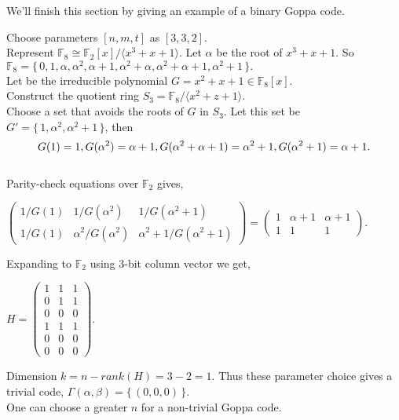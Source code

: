 We'll finish this section by giving an example of a binary Goppa code.
\begin{exmp}
    Choose parameters $[n, m, t]$ as $[3, 3, 2]$.\\
    Represent $\mathbb{F}_8 \cong \mathbb{F}_2[x]/ \langle x^3+x+1 \rangle$. Let $\alpha$ be the root of $x^3+x+1$. So $\mathbb{F}_8 = \{\,0,1,\alpha,\alpha^2,\alpha+1,\alpha^2+\alpha, \alpha^2+\alpha+1,\alpha^2+1\,\}.$\\ 
    Let be the irreducible polynomial $G = x^2+x+1 \in \mathbb{F}_8[x]$.\\
    Construct the quotient ring $S_3 = \mathbb{F}_8/\langle x^2+z+1\rangle.$\\
    Choose a set that avoids the roots of $G$ in $S_3$. Let this set be 
    $G'=\{\,1, \alpha^2,\alpha^2+1\,\}$, then
    \[        
    \noindent G(1)=1\\,G(\alpha^2)=\alpha+1\\,
    G(\alpha^2+\alpha+1)=\alpha^2+1\\,G(\alpha^2+1)=\alpha+1.
    \]\\
    Parity-check equations over $\mathbb{F}_2$ gives,
\begin{center}
    $\begin{pmatrix}
    1/G(1) &1/G(\alpha^2)& 1/G(\alpha^2+1)\\
    1/G(1) &\alpha^2/G(\alpha^2)& \alpha^2+1/G(\alpha^2+1)
    \end{pmatrix} = \begin{pmatrix}
    1 & \alpha+1 & \alpha+1\\
    1 & 1 & 1
    \end{pmatrix}.$\\[0.4cm]
\end{center}
    Expanding to $\mathbb{F}_2$ using 3-bit column vector we get,
\begin{center}
    $H=\begin{pmatrix}
        1&1&1\\
        0&1&1\\
        0&0&0\\
        1&1&1\\
        0&0&0\\
        0&0&0
    \end{pmatrix}.$\\[0.4cm]
\end{center}
    Dimension $k = n-rank(H)=3-2=1$. Thus these parameter choice gives a trivial code, $\Gamma(\alpha, \beta) = \{\,(0,0,0)\,\}$.\\
    One can choose a greater $n$ for a non-trivial Goppa code.
\end{exmp}


